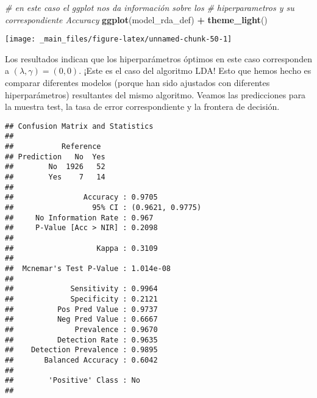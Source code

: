 \documentclass[]{book}
\newenvironment{Shaded}{\begin{snugshade}}{\end{snugshade}}
\newcommand{\CommentTok}[1]{\textcolor[rgb]{0.56,0.35,0.01}{\textit{#1}}}
\newcommand{\DataTypeTok}[1]{\textcolor[rgb]{0.13,0.29,0.53}{#1}}
\newcommand{\KeywordTok}[1]{\textcolor[rgb]{0.13,0.29,0.53}{\textbf{#1}}}
\newcommand{\NormalTok}[1]{#1}
\newcommand{\OperatorTok}[1]{\textcolor[rgb]{0.81,0.36,0.00}{\textbf{#1}}}
\newcommand{\StringTok}[1]{\textcolor[rgb]{0.31,0.60,0.02}{#1}}
\begin{document}
\begin{Shaded}
\begin{Highlighting}[]
\CommentTok{# en este caso el ggplot nos da información sobre los }
\CommentTok{# hiperparametros y su correspondiente Accuracy}
\KeywordTok{ggplot}\NormalTok{(model_rda_def) }\OperatorTok{+}\StringTok{ }\KeywordTok{theme_light}\NormalTok{()}
\end{Highlighting}
\end{Shaded}

\begin{center}\texttt{[image: \_main\_files/figure-latex/unnamed-chunk-50-1]} \end{center}

Los resultados indican que los hiperparámetros óptimos en este caso corresponden a \((\lambda, \gamma) = (0,0)\). ¡Este es el caso del algoritmo LDA! Esto que hemos hecho es comparar diferentes modelos (porque han sido ajustados con diferentes hiperparámetros) resultantes del mismo algoritmo. Veamos las predicciones para la muestra test, la tasa de error correspondiente y la frontera de decisión.

\begin{Shaded}
\end{Shaded}

\begin{verbatim}
## Confusion Matrix and Statistics
## 
##           Reference
## Prediction   No  Yes
##        No  1926   52
##        Yes    7   14
##                                           
##                Accuracy : 0.9705          
##                  95% CI : (0.9621, 0.9775)
##     No Information Rate : 0.967           
##     P-Value [Acc > NIR] : 0.2098          
##                                           
##                   Kappa : 0.3109          
##                                           
##  Mcnemar's Test P-Value : 1.014e-08       
##                                           
##             Sensitivity : 0.9964          
##             Specificity : 0.2121          
##          Pos Pred Value : 0.9737          
##          Neg Pred Value : 0.6667          
##              Prevalence : 0.9670          
##          Detection Rate : 0.9635          
##    Detection Prevalence : 0.9895          
##       Balanced Accuracy : 0.6042          
##                                           
##        'Positive' Class : No              
## 
\end{verbatim}
\end{document}
